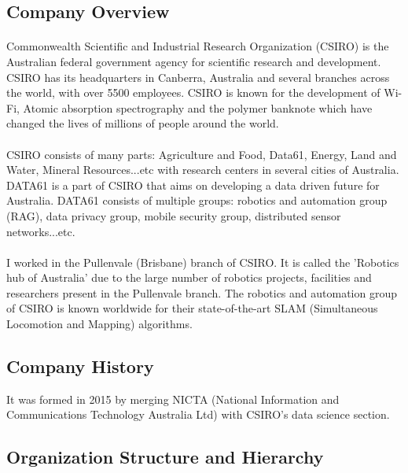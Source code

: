 
\subsection{Company Overview}

\paragraph{}
Commonwealth Scientific and Industrial Research Organization (CSIRO) is the Australian federal government agency for scientific research and development.  CSIRO has its headquarters in Canberra, Australia and several branches across the world, with over 5500 employees. CSIRO is known for the development of Wi-Fi, Atomic absorption spectrography and the polymer banknote which have changed the lives of millions of people around the world.

\paragraph{}
CSIRO consists of many parts: Agriculture and Food, Data61, Energy, Land and Water, Mineral Resources...etc with research centers in several cities of Australia. DATA61 is a part of CSIRO that aims on developing a data driven future for Australia. DATA61 consists of multiple groups: robotics and automation group (RAG), data privacy group, mobile security group, distributed sensor networks...etc. 

\paragraph{}
I worked in the Pullenvale (Brisbane) branch of CSIRO. It is called the 'Robotics hub of Australia' due to the large number of robotics projects, facilities and researchers present in the Pullenvale branch. The robotics and automation group of CSIRO is known worldwide for their state-of-the-art SLAM (Simultaneous Locomotion and Mapping) algorithms.

\subsection{Company History}

It was formed in 2015 by merging NICTA (National Information and Communications Technology Australia Ltd) with CSIRO's data science section. 

\subsection{Organization Structure and Hierarchy}
